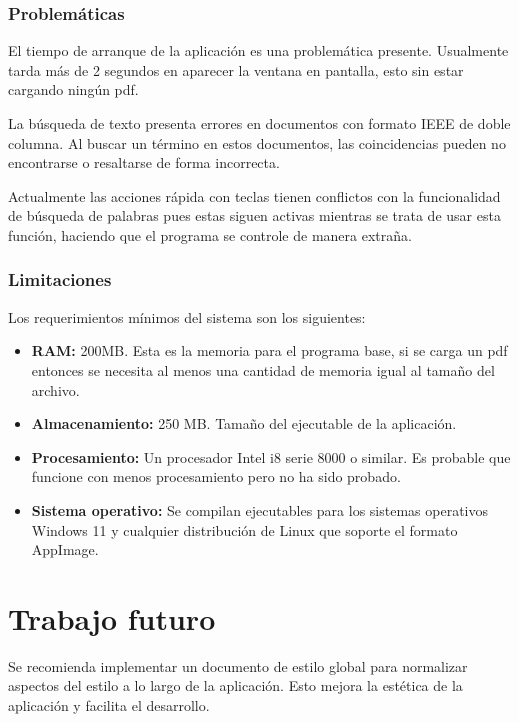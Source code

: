 \subsubsection{Problemáticas}

El tiempo de arranque de la aplicación es una problemática presente. Usualmente tarda más de 2 segundos en aparecer la ventana en pantalla, esto sin estar cargando ningún pdf.

La búsqueda de texto presenta errores en documentos con formato IEEE de doble columna. Al buscar un término en estos documentos, las coincidencias pueden no encontrarse o resaltarse de forma incorrecta.

Actualmente las acciones rápida con teclas tienen conflictos con la funcionalidad de búsqueda de palabras pues estas siguen activas mientras se trata de usar esta función, haciendo que el programa se controle de manera extraña.

\subsubsection{Limitaciones}



Los requerimientos mínimos del sistema son los siguientes:
\begin{itemize}
	\item \textbf{RAM: }200MB. Esta es la memoria para el programa base, si se carga un pdf entonces se necesita al menos una cantidad de memoria igual al tamaño del archivo.
	\item \textbf{Almacenamiento:} 250 MB. Tamaño del ejecutable de la aplicación.
	\item \textbf{Procesamiento:} Un procesador Intel i8 serie 8000 o similar. Es probable que funcione con menos procesamiento pero no ha sido probado.
	\item \textbf{Sistema operativo:} Se compilan ejecutables para los sistemas operativos Windows 11 y cualquier distribución de Linux que soporte el formato AppImage.
\end{itemize}


\section{Trabajo futuro}

Se recomienda implementar un documento de estilo global para normalizar aspectos del estilo a lo largo de la aplicación. Esto mejora la estética de la aplicación y facilita el desarrollo.

